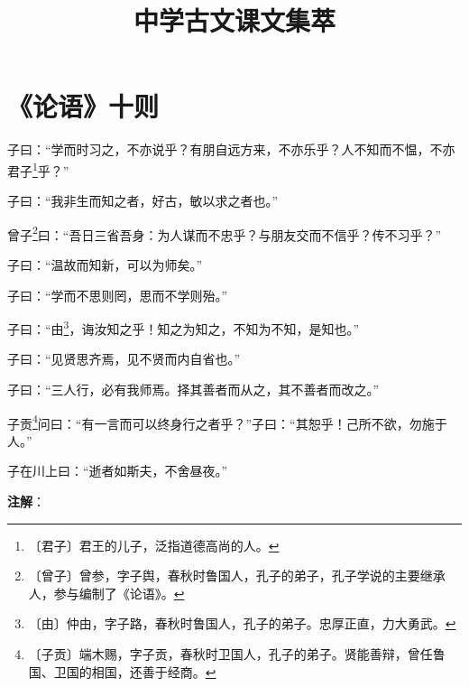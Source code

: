 \documentclass[12pt,UTF-8,openany]{ctexbook}
\title{\zihao{0} \bfseries 中学古文课文集萃}
\author{}
\date{}
\begin{document}
\maketitle
\tableofcontents
\newpage

\chapter{《论语》十则}

\begin{normalsize}
    
    子曰：“学而时习之，不亦说乎？有朋自远方来，不亦乐乎？人不知而不愠，不亦君子\footnote{〔君子〕君王的儿子，泛指道德高尚的人。}乎？”
    
    子曰：“我非生而知之者，好古，敏以求之者也。”
    
    曾子\footnote{〔曾子〕曾参，字子舆，春秋时鲁国人，孔子的弟子，孔子学说的主要继承人，参与编制了《论语》。}曰：“吾日三省吾身：为人谋而不忠乎？与朋友交而不信乎？传不习乎？”
    
    子曰：“温故而知新，可以为师矣。”
    
    子曰：“学而不思则罔，思而不学则殆。”
    
    子曰：“由\footnote{〔由〕仲由，字子路，春秋时鲁国人，孔子的弟子。忠厚正直，力大勇武。}，诲汝知之乎！知之为知之，不知为不知，是知也。”
    
    子曰：“见贤思齐焉，见不贤而内自省也。”
    
    子曰：“三人行，必有我师焉。择其善者而从之，其不善者而改之。”
    
    子贡\footnote{〔子贡〕端木赐，字子贡，春秋时卫国人，孔子的弟子。贤能善辩，曾任鲁国、卫国的相国，还善于经商。}问曰：“有一言而可以终身行之者乎？”子曰：“其恕乎！己所不欲，勿施于人。”
    
    子在川上曰：“逝者如斯夫，不舍昼夜。”
\end{normalsize}


\newpage

\textbf{注解}：

\vspace{-1em}
\end{document}
